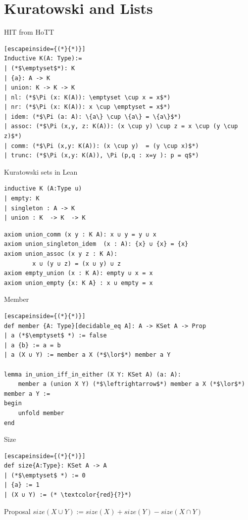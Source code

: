 \documentclass[aspectratio=169]{beamer}
\begin{document}
    \section{Kuratowski and Lists}
    \begin{frame}[fragile]{HIT from HoTT\cite{HoTT-FinSets}}
        \begin{lstlisting}[escapeinside={(*}{*)}]   
Inductive K(A: Type):=
| (*$\emptyset$*): K
| {a}: A -> K
| union: K -> K -> K
| nl: (*$\Pi (x: K(A)): \emptyset \cup x = x$*)
| nr: (*$\Pi (x: K(A)): x \cup \emptyset = x$*)
| idem: (*$\Pi (a: A): \{a\} \cup \{a\} = \{a\}$*)
| assoc: (*$\Pi (x,y, z: K(A)): (x \cup y) \cup z = x \cup (y \cup z)$*)
| comm: (*$\Pi (x,y: K(A)): (x \cup y)  = (y \cup x)$*)
| trunc: (*$\Pi (x,y: K(A)), \Pi (p,q : x=y ): p = q$*)

        \end{lstlisting}
    \end{frame}
\begin{frame}[fragile]{Kuratowski sets in Lean}
    \begin{lstlisting}
inductive K (A:Type u) 
| empty: K 
| singleton : A -> K 
| union : K  -> K  -> K
    \end{lstlisting}
    \pause 
    \begin{lstlisting}
axiom union_comm (x y : K A): x ∪ y = y ∪ x
axiom union_singleton_idem  (x : A): {x} ∪ {x} = {x}
axiom union_assoc (x y z : K A): 
        x ∪ (y ∪ z) = (x ∪ y) ∪ z
axiom empty_union (x : K A): empty ∪ x = x
axiom union_empty {x: K A} : x ∪ empty = x
    \end{lstlisting}
    
\end{frame}
\begin{frame}[fragile]{Member}
    \begin{lstlisting}[escapeinside={(*}{*)}] 
def member {A: Type}[decidable_eq A]: A -> KSet A -> Prop
| a (*$\emptyset$ *) := false
| a {b} := a = b
| a (X ∪ Y) := member a X (*$\lor$*) member a Y

lemma in_union_iff_in_either (X Y: KSet A) (a: A):
    member a (union X Y) (*$\leftrightarrow$*) member a X (*$\lor$*) member a Y :=
begin 
    unfold member
end
    \end{lstlisting}
\end{frame}

\begin{frame}[fragile]{Size}
    \begin{lstlisting}[escapeinside={(*}{*)}]        
def size{A:Type}: KSet A -> A
| (*$\emptyset$ *) := 0
| {a} := 1
| (X ∪ Y) := (* \textcolor{red}{?}*)
    \end{lstlisting}
\pause
    \begin{block}{Proposal}
        $size(X \cup Y) := size(X) + size (Y) - size(X \cap Y)$
    \end{block}
\end{frame}
\end{document}
